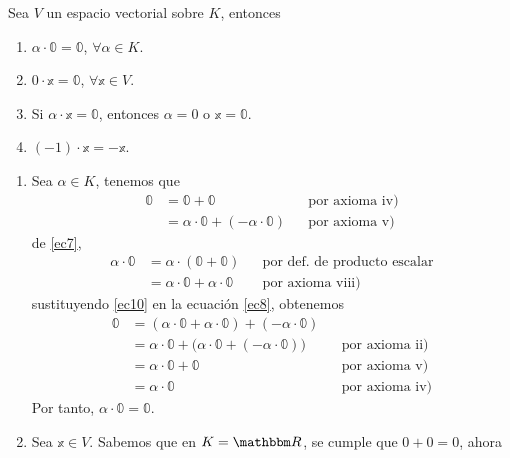 \begin{theorem}
    Sea $V$ un espacio vectorial sobre $K$, entonces
    \begin{enumerate}[label=\roman*.]
        \item $\alpha \cdot \mathbb{0} = \mathbb{0}$, $\forall \alpha \in K$.
        \item $0 \cdot \mathbb{x} = \mathbb{0}$, $\forall \mathbb{x} \in V$.
        \item Si $\alpha \cdot \mathbb{x} = \mathbb{0}$, entonces $\alpha = 0$ o $\mathbb{x} = \mathbb{0}$.
        \item $(-1) \cdot \mathbb{x} = - \mathbb{x}$.
    \end{enumerate}
    \demostracion
    \begin{enumerate}[label=\roman*.]
        \item Sea $\alpha \in K$, tenemos que
        \begin{align}
            \mathbb{0} & = \mathbb{0} + \mathbb{0} && \text{por axioma iv)} \label{ec7} \\
            & = \alpha \cdot \mathbb{0} + (-\alpha \cdot \mathbb{0}) && \text{por axioma v)} \label{ec8}
        \end{align}
        de \eqref{ec7},
        \begin{align}
            \alpha \cdot \mathbb{0} & = \alpha \cdot (\mathbb{0} + \mathbb{0}) && \text{por def. de producto escalar} \label{ec9} \\
            & = \alpha \cdot \mathbb{0} + \alpha \cdot \mathbb{0} && \text{por axioma viii)} \label{ec10}
        \end{align}
        sustituyendo \eqref{ec10} en la ecuación \eqref{ec8}, obtenemos
        \begin{align*}
            \mathbb{0} & = (\alpha \cdot \mathbb{0} + \alpha \cdot \mathbb{0}) + (-\alpha \cdot \mathbb{0}) \\
            & = \alpha \cdot \mathbb{0} + \big( \alpha \cdot \mathbb{0} + (-\alpha \cdot \mathbb{0}) \big) && \text{por axioma ii)} \\
            & = \alpha \cdot \mathbb{0} + \mathbb{0} && \text{por axioma v)} \\
            & = \alpha \cdot \mathbb{0} && \text{por axioma iv)}
        \end{align*}
        Por tanto, $\alpha \cdot \mathbb{0} = \mathbb{0}$.
        \item Sea $\mathbb{x} \in V$. Sabemos que en $K = \RR$, se cumple que $0 + 0 = 0$, ahora
        \begin{align}

\end{align}
\end{enumerate}
\end{theorem}
